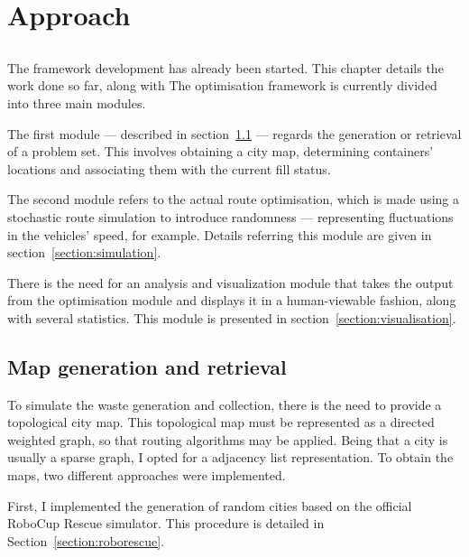 \chapter{Approach}
\label{chap:approach}

\section*{}

The framework development has already been started. This chapter details the
work done so far, along with 
The optimisation framework is currently divided into three main modules.

The first module --- described in section~\ref{section:map-generation} ---
regards the generation or retrieval of a problem set. This involves obtaining a
city map, determining containers' locations and associating them with the
current fill status. 

The second module refers to the actual route optimisation, which is made using
a stochastic route simulation to introduce randomness --- representing
fluctuations in the vehicles' speed, for example. Details referring this module
are given in section~\ref{section:simulation}.

There is the need for an analysis and visualization module that takes the
output from the optimisation module and displays it in a human-viewable
fashion, along with several statistics. This module is presented in
section~\ref{section:visualisation}.

\section{Map generation and retrieval}
\label{section:map-generation}

To simulate the waste generation and collection, there is the need to provide a
topological city map. This topological map must be represented as a directed
weighted graph, so that routing algorithms may be applied. Being that a city is
usually a sparse graph, I opted for a adjacency list representation. To obtain
the maps, two different approaches were implemented.

First, I implemented the generation of random cities based on the official
RoboCup Rescue simulator. This procedure is detailed in
Section~\ref{section:roborescue}.

